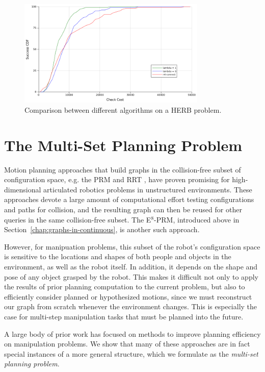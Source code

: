 \begin{figure}
   \centering
   \includegraphics[width=0.8\textwidth]{figs/timegreedy-herbstep1-comparison-cdfs.png}
   \caption{Comparison between different algorithms on a HERB problem.}
   \label{fig:herb-comparison-cdfs}
\end{figure}

\section{The Multi-Set Planning Problem}
\label{chap:multi-set}

Motion planning approaches that build graphs
in the collision-free subset of
configuration space,
e.g. the
PRM \cite{kavrakietal1996prm}
and RRT \cite{lavallekuffner1999rrt},
have proven promising
for high-dimensional articulated robotics problems
in unstructured environments.
These approaches devote a large amount of computational effort
testing configurations and paths for collision,
and the resulting graph can then be reused
for other queries in the same collision-free subset.
The E$^8$-PRM,
introduced above in Section~\ref{chap:graphs-in-continuous},
is another such approach.

However,
for manipuation problems,
this subset of the robot's configuration space
is sensitive to the locations and shapes of
both people and objects in the environment,
as well as the robot itself.
In addition, it depends on the shape and pose of any object
grasped by the robot.
This makes it difficult not only to apply the results of prior
planning computation to the current problem,
but also to efficiently consider planned or hypothesized motions,
since we must reconstruct our graph from scratch whenever
the environment changes.
This is especially the case for
multi-step manipulation tasks that must be planned into the future.

A large body of prior work has focused on methods to
improve planning efficiency on manipulation problems.
We show that many of these approaches are
in fact special instances of a more general structure,
which we formulate as the \emph{multi-set planning problem}.

